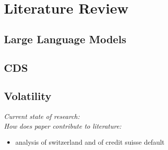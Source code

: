 \chapter{Literature Review}\label{sec3}
\thispagestyle{empty}

\section{Large Language Models}

\section{CDS}

\section{Volatility}

\textit{Current state of research:}\\

\noindent
\textit{How does paper contribute to literature:}

\begin{itemize}
	\item analysis of switzerland and of credit suisse default
\end{itemize}

\cleardoublepage
